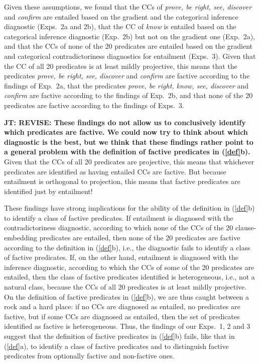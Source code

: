 \documentclass[11pt,fleqn]{article}
\newcommand{\6}{\mbox{$[\hspace*{-.6mm}[$}}
\newcommand{\9}{\mbox{$]\hspace*{-.6mm}]$}}
\newcommand{\jt}[1]{\textbf{\color{blue}JT: #1}}
\begin{document}
{Given these assumptions, we found that the CCs of {\em prove, be right, see, discover} and {\em confirm} are entailed based on the gradient and the categorical inference diagnostic (Exps.~2a and 2b), that the CC of {\em know} is entailed based on the categorical inference diagnostic (Exp.~2b) but not on the gradient one (Exp.~2a), and that the CCs of none of the 20 predicates are entailed based on the gradient and categorical contradictoriness diagnostics for entailment (Exps.~3). Given that the CC of all 20 predicates is at least mildly projective, this means that the predicates {\em prove, be right, see, discover} and {\em confirm} are factive according to the findings of Exp.~2a, that the predicates {\em prove, be right, know, see, discover} and {\em confirm} are factive according to the findings of Exp.~2b, and that none of the 20 predicates are factive according to the findings of Exps.~3. 

\jt{REVISE: These findings do not allow us to conclusively identify which predicates are factive. We could now try to think about which diagnostic is the best, but we think that these findings rather point to a general problem with the definition of factive predicates in (\ref{def}b).}  Given that the CCs of all 20 predicates are projective, this means that whichever predicates are identified as having entailed CCs are factive. But because entailment is orthogonal to projection, this means that factive predicates are identified just by entailment!

These findings have strong implications for the ability of the definition in (\ref{def}b) to identify a class of factive predicates. If entailment is diagnosed with the contradictoriness diagnostic, according to which none of the CCs of the 20 clause-embedding predicates are entailed, then none of the 20 predicates are factive according to the definition in (\ref{def}b), i.e., the diagnostic fails to identify a class of factive predicates. If, on the other hand, entailment is diagnosed with the inference diagnostic, according to which the CCs of some of the 20 predicates are entailed, then the class of factive predicates identified is heterogeneous, i.e., not a natural class, because the CCs of all 20 predicates is at least mildly projective. On the definition of factive predicates in (\ref{def}b), we are thus caught between a rock and a hard place: if no CCs are diagnosed as entailed, no predicates are factive, but if some CCs are diagnosed as entailed, then the set of predicates identified as factive is heterogeneous. Thus, the findings of our Exps.~1, 2 and 3 suggest that the definition of factive predicates in (\ref{def}b) fails, like that in (\ref{def}a), to identify a class of factive predicates and to distinguish factive predicates from optionally factive and non-factive ones.

}
\end{document}
